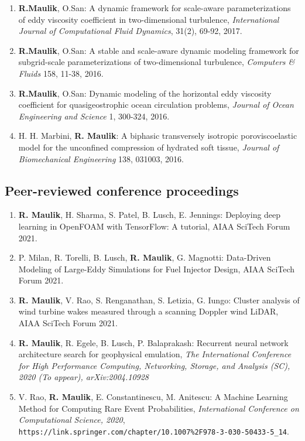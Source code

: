 \documentclass[letterpaper]{article}
\begin{document}
\begin{enumerate}
\item \textbf{R.Maulik}, O.San: A dynamic framework for scale-aware parameterizations of eddy viscosity coefficient in two-dimensional turbulence, {\it International Journal of Computational Fluid Dynamics}, 31(2), 69-92, 2017.

\item \textbf{R.Maulik}, O.San: A stable and scale-aware dynamic modeling framework for subgrid-scale parameterizations of two-dimensional turbulence, {\it Computers \& Fluids} 158, 11-38, 2016.

\item \textbf{R.Maulik}, O.San: Dynamic modeling of the horizontal eddy viscosity coefficient for quasigeostrophic ocean circulation problems, {\it Journal of Ocean Engineering and Science} 1, 300-324, 2016.

\item H. H. Marbini, \textbf{R. Maulik}: A biphasic transversely isotropic poroviscoelastic model for the unconfined compression of hydrated soft tissue, {\it Journal of Biomechanical Engineering} 138, 031003, 2016.

\end{enumerate}

\subsection*{Peer-reviewed conference proceedings}

\begin{enumerate}

\item \textbf{R. Maulik}, H. Sharma, S. Patel, B. Lusch, E. Jennings: Deploying deep learning in OpenFOAM with TensorFlow: A tutorial, AIAA SciTech Forum 2021.

\item P. Milan, R. Torelli, B. Lusch, \textbf{R. Maulik}, G. Magnotti: Data-Driven Modeling of Large-Eddy Simulations for Fuel Injector Design, AIAA SciTech Forum 2021.

\item \textbf{R. Maulik}, V. Rao, S. Renganathan, S. Letizia, G. Iungo: Cluster analysis of wind turbine wakes measured through a scanning Doppler wind LiDAR, AIAA SciTech Forum 2021.

\item \textbf{R. Maulik}, R. Egele, B. Lusch,  P. Balaprakash: Recurrent neural network architecture search for geophysical emulation, {\it The International Conference for High Performance Computing, Networking, Storage, and Analysis (SC), 2020 (To appear), arXiv:2004.10928}

\item V. Rao, \textbf{R. Maulik}, E. Constantinescu, M. Anitescu: A Machine Learning Method for Computing Rare Event Probabilities, {\it International Conference on Computational Science, 2020}, \\ \texttt{https://link.springer.com/chapter/10.1007\%2F978-3-030-50433-5\_14}.

\end{enumerate}
\end{document}
